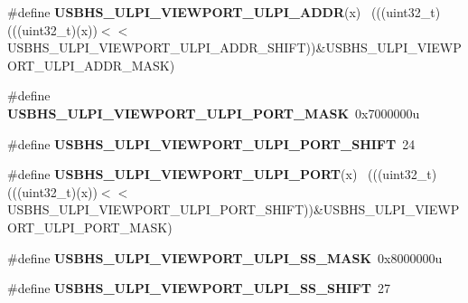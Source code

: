 \begin{DoxyCompactItemize}
\item 
\hypertarget{group___u_s_b_h_s___register___masks_ga6977ffb86ed9aa4a279b1c0a6813f12a}{}\#define {\bfseries U\+S\+B\+H\+S\+\_\+\+U\+L\+P\+I\+\_\+\+V\+I\+E\+W\+P\+O\+R\+T\+\_\+\+U\+L\+P\+I\+\_\+\+A\+D\+D\+R}(x)              ~(((uint32\+\_\+t)(((uint32\+\_\+t)(x))$<$$<$U\+S\+B\+H\+S\+\_\+\+U\+L\+P\+I\+\_\+\+V\+I\+E\+W\+P\+O\+R\+T\+\_\+\+U\+L\+P\+I\+\_\+\+A\+D\+D\+R\+\_\+\+S\+H\+I\+F\+T))\&U\+S\+B\+H\+S\+\_\+\+U\+L\+P\+I\+\_\+\+V\+I\+E\+W\+P\+O\+R\+T\+\_\+\+U\+L\+P\+I\+\_\+\+A\+D\+D\+R\+\_\+\+M\+A\+S\+K)\label{group___u_s_b_h_s___register___masks_ga6977ffb86ed9aa4a279b1c0a6813f12a}

\item 
\hypertarget{group___u_s_b_h_s___register___masks_ga73ef357f50ce23f6529f6bd0650912f7}{}\#define {\bfseries U\+S\+B\+H\+S\+\_\+\+U\+L\+P\+I\+\_\+\+V\+I\+E\+W\+P\+O\+R\+T\+\_\+\+U\+L\+P\+I\+\_\+\+P\+O\+R\+T\+\_\+\+M\+A\+S\+K}~0x7000000u\label{group___u_s_b_h_s___register___masks_ga73ef357f50ce23f6529f6bd0650912f7}

\item 
\hypertarget{group___u_s_b_h_s___register___masks_ga21dc0f6ad6c1cdfb18e8b9a3440c023c}{}\#define {\bfseries U\+S\+B\+H\+S\+\_\+\+U\+L\+P\+I\+\_\+\+V\+I\+E\+W\+P\+O\+R\+T\+\_\+\+U\+L\+P\+I\+\_\+\+P\+O\+R\+T\+\_\+\+S\+H\+I\+F\+T}~24\label{group___u_s_b_h_s___register___masks_ga21dc0f6ad6c1cdfb18e8b9a3440c023c}

\item 
\hypertarget{group___u_s_b_h_s___register___masks_ga48c00bf2d27a51e1b862e800c4755076}{}\#define {\bfseries U\+S\+B\+H\+S\+\_\+\+U\+L\+P\+I\+\_\+\+V\+I\+E\+W\+P\+O\+R\+T\+\_\+\+U\+L\+P\+I\+\_\+\+P\+O\+R\+T}(x)              ~(((uint32\+\_\+t)(((uint32\+\_\+t)(x))$<$$<$U\+S\+B\+H\+S\+\_\+\+U\+L\+P\+I\+\_\+\+V\+I\+E\+W\+P\+O\+R\+T\+\_\+\+U\+L\+P\+I\+\_\+\+P\+O\+R\+T\+\_\+\+S\+H\+I\+F\+T))\&U\+S\+B\+H\+S\+\_\+\+U\+L\+P\+I\+\_\+\+V\+I\+E\+W\+P\+O\+R\+T\+\_\+\+U\+L\+P\+I\+\_\+\+P\+O\+R\+T\+\_\+\+M\+A\+S\+K)\label{group___u_s_b_h_s___register___masks_ga48c00bf2d27a51e1b862e800c4755076}

\item 
\hypertarget{group___u_s_b_h_s___register___masks_gaf933e838371e9c35448bad7d1bc9028d}{}\#define {\bfseries U\+S\+B\+H\+S\+\_\+\+U\+L\+P\+I\+\_\+\+V\+I\+E\+W\+P\+O\+R\+T\+\_\+\+U\+L\+P\+I\+\_\+\+S\+S\+\_\+\+M\+A\+S\+K}~0x8000000u\label{group___u_s_b_h_s___register___masks_gaf933e838371e9c35448bad7d1bc9028d}

\item 
\hypertarget{group___u_s_b_h_s___register___masks_gacd2ecd6c4fd83f1aa76ddfaf0bf56de4}{}\#define {\bfseries U\+S\+B\+H\+S\+\_\+\+U\+L\+P\+I\+\_\+\+V\+I\+E\+W\+P\+O\+R\+T\+\_\+\+U\+L\+P\+I\+\_\+\+S\+S\+\_\+\+S\+H\+I\+F\+T}~27\label{group___u_s_b_h_s___register___masks_gacd2ecd6c4fd83f1aa76ddfaf0bf56de4}


\end{DoxyCompactItemize}
